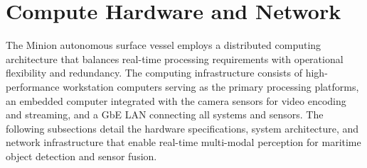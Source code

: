 \documentclass{erauthesis}
\begin{document}


\section{Compute Hardware and Network} \label{sec:Atlas_LAN}

The Minion autonomous surface vessel employs a distributed computing architecture that balances real-time processing requirements with operational flexibility and redundancy. 
The computing infrastructure consists of high-performance workstation computers serving as the primary processing platforms, an embedded computer integrated with the camera sensors for video encoding and streaming, and a \ac{GbE} \ac{LAN} connecting all systems and sensors. 
The following subsections detail the hardware specifications, system architecture, and network infrastructure that enable real-time multi-modal perception for maritime object detection and sensor fusion.
\end{document}
